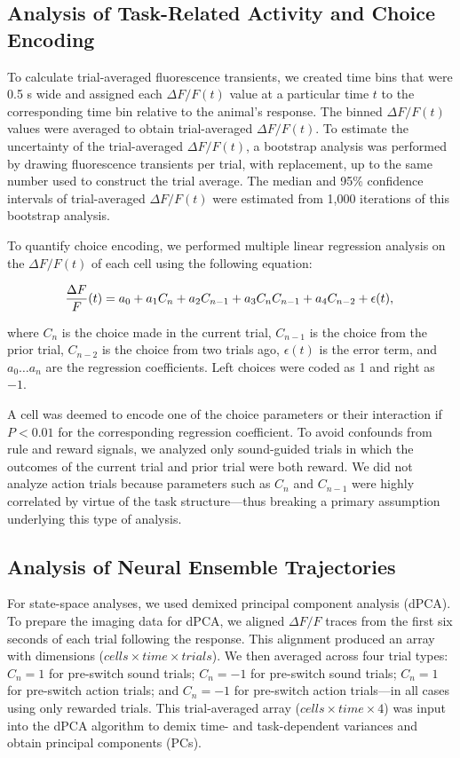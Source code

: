 \subsection*{Analysis of Task-Related Activity and Choice Encoding}
To calculate trial-averaged fluorescence transients, we created time bins that were 0.5 s wide and assigned each $\Delta F/F (t)$ value at a particular time $t$ to the corresponding time bin relative to the animal's response. The binned $\Delta F/F (t)$ values were averaged to obtain trial-averaged $\Delta F/F (t)$. To estimate the uncertainty of the trial-averaged $\Delta F/F (t)$, a bootstrap analysis was performed by drawing fluorescence transients per trial, with replacement, up to the same number used to construct the trial average. The median and 95\% confidence intervals of trial-averaged $\Delta F/F (t)$ were estimated from 1,000 iterations of this bootstrap analysis. 

To quantify choice encoding, we performed multiple linear regression analysis on the $\Delta F/F (t)$ of each cell using the following equation:

\begin{equation*}
\frac{\Delta F}{F}(t) = a_0 + a_1 C_{n} + a_2 C_{n-1} + a_3 C_{n} C_{n-1} + a_4 C_{n-2} + \epsilon(t),\\
\end{equation*}

\noindent where $C_n$ is the choice made in the current trial, $C_{n-1}$ is the choice from the prior trial, $C_{n-2}$ is the choice from two trials ago, $\epsilon (t)$ is the error term, and $a_0 \ldots a_n$ are the regression coefficients. Left choices were coded as 1 and right as $-1$. 

A cell was deemed to encode one of the choice parameters or their interaction if $P < 0.01$ for the corresponding regression coefficient. To avoid confounds from rule and reward signals, we analyzed only sound-guided trials in which the outcomes of the current trial and prior trial were both reward. We did not analyze action trials because parameters such as $C_n$ and $C_{n-1}$ were highly correlated by virtue of the task structure---thus breaking a primary assumption underlying this type of analysis.

\subsection*{Analysis of Neural Ensemble Trajectories}
For state-space analyses, we used demixed principal component analysis \citep{machens2010functional} (dPCA). To prepare the imaging data for dPCA, we aligned $\Delta F/F$ traces from the first six seconds of each trial following the response. This alignment produced an array with dimensions ($\mathit{cells} \times \mathit{time} \times \mathit{trials}$). We then averaged across four trial types: $C_n = 1$ for pre-switch sound trials; $C_n = -1$ for pre-switch sound trials; $C_n = 1$ for pre-switch action trials; and $C_n = -1$ for pre-switch action trials---in all cases using only rewarded trials. This trial-averaged array ($\mathit{cells} \times \mathit{time} \times 4$) was input into the dPCA algorithm to demix time- and task-dependent variances and obtain principal components (PCs). 

